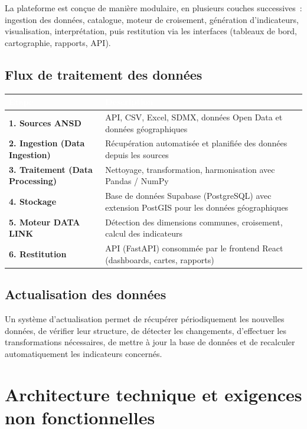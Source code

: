 \documentclass[11pt,a4paper]{article}
\begin{document}
La plateforme est conçue de manière modulaire, en plusieurs couches successives~: ingestion des données, catalogue, moteur de croisement, génération d'indicateurs, visualisation, interprétation, puis restitution via les interfaces (tableaux de bord, cartographie, rapports, API).

\subsection{Flux de traitement des données}

\begin{longtable}{@{}>{\bfseries}p{4.6cm} p{9.9cm}@{}}
\rowcolor{navy}
\textcolor{white}{Étape} & \textcolor{white}{Description} \\
\endhead
1. Sources ANSD & API, CSV, Excel, SDMX, données Open Data et données géographiques \\
2. Ingestion (Data Ingestion) & Récupération automatisée et planifiée des données depuis les sources \\
3. Traitement (Data Processing) & Nettoyage, transformation, harmonisation avec Pandas / NumPy \\
4. Stockage & Base de données Supabase (PostgreSQL) avec extension PostGIS pour les données géographiques \\
5. Moteur DATA LINK & Détection des dimensions communes, croisement, calcul des indicateurs \\
6. Restitution & API (FastAPI) consommée par le frontend React (dashboards, cartes, rapports) \\
\end{longtable}

\subsection{Actualisation des données}

Un système d'actualisation permet de récupérer périodiquement les nouvelles données, de vérifier leur structure, de détecter les changements, d'effectuer les transformations nécessaires, de mettre à jour la base de données et de recalculer automatiquement les indicateurs concernés.

\section{Architecture technique et exigences non fonctionnelles}
\end{document}
